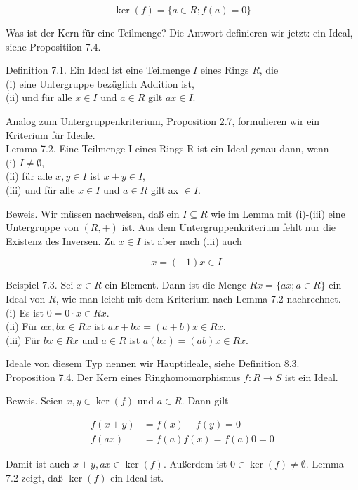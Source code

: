 \documentclass[10pt, letterpaper]{article}
\begin{document}
$$
\operatorname{ker}(f)=\{a \in R ; f(a)=0\}
$$

Was ist der Kern für eine Teilmenge? Die Antwort definieren wir jetzt: ein Ideal, siehe Propositiion 7.4.

Definition 7.1. Ein Ideal ist eine Teilmenge $I$ eines Rings $R$, die\\
(i) eine Untergruppe bezüglich Addition ist,\\
(ii) und für alle $x \in I$ und $a \in R$ gilt $a x \in I$.

Analog zum Untergruppenkriterium, Proposition 2.7, formulieren wir ein Kriterium für Ideale.\\
Lemma 7.2. Eine Teilmenge I eines Rings R ist ein Ideal genau dann, wenn\\
(i) $I \neq \emptyset$,\\
(ii) für alle $x, y \in I$ ist $x+y \in I$,\\
(iii) und für alle $x \in I$ und $a \in R$ gilt ax $\in I$.

Beweis. Wir müssen nachweisen, daß ein $I \subseteq R$ wie im Lemma mit (i)-(iii) eine Untergruppe von $(R,+)$ ist. Aus dem Untergruppenkriterium fehlt nur die Existenz des Inversen. Zu $x \in I$ ist aber nach (iii) auch

$$
-x=(-1) x \in I
$$

Beispiel 7.3. Sei $x \in R$ ein Element. Dann ist die Menge $R x=\{a x ; a \in R\}$ ein Ideal von $R$, wie man leicht mit dem Kriterium nach Lemma 7.2 nachrechnet.\\
(i) Es ist $0=0 \cdot x \in R x$.\\
(ii) Für $a x, b x \in R x$ ist $a x+b x=(a+b) x \in R x$.\\
(iii) Für $b x \in R x$ und $a \in R$ ist $a(b x)=(a b) x \in R x$.

Ideale von diesem Typ nennen wir Hauptideale, siehe Definition 8.3.\\
Proposition 7.4. Der Kern eines Ringhomomorphismus $f: R \rightarrow S$ ist ein Ideal.

Beweis. Seien $x, y \in \operatorname{ker}(f)$ und $a \in R$. Dann gilt

$$
\begin{aligned}
f(x+y) & =f(x)+f(y)=0 \\
f(a x) & =f(a) f(x)=f(a) 0=0
\end{aligned}
$$

Damit ist auch $x+y, a x \in \operatorname{ker}(f)$. Außerdem ist $0 \in \operatorname{ker}(f) \neq \emptyset$. Lemma 7.2 zeigt, daß $\operatorname{ker}(f)$ ein Ideal ist.
\end{document}
